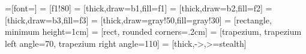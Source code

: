 \usepackage{mathpazo}
\renewcommand*\rmdefault{ppl}
\usepackage[scaled=.95]{helvet}
\renewcommand*\sfdefault{phv}
\renewcommand*\ttdefault{lmtt}

\newcommand{\rmt}[1]{{\rmfamily\large{#1}}} 

\usepackage{xcolor}
\newcommand{\textcm}[1]{\textcolor{b1}{#1}}
\newcommand{\textch}[1]{\textcolor{b2}{#1}}
\newcommand{\textcb}[1]{\textcolor{b3}{#1}}

\usepackage{tikz}
=[font=\sffamily \large]
\usetikzlibrary{shapes,arrows,positioning,calc,decorations.markings,backgrounds}
 = [f1!80]
 = [thick,draw=b1,fill=f1]
 = [thick,draw=b2,fill=f2]
 = [thick,draw=b3,fill=f3]
 = [thick,draw=gray!50,fill=gray!30]
 = [rectangle, minimum height=1cm]
 = [rect, rounded corners=.2cm]
 = [trapezium, trapezium left angle=70, trapezium right angle=110]
 = [thick,->,>=stealth]